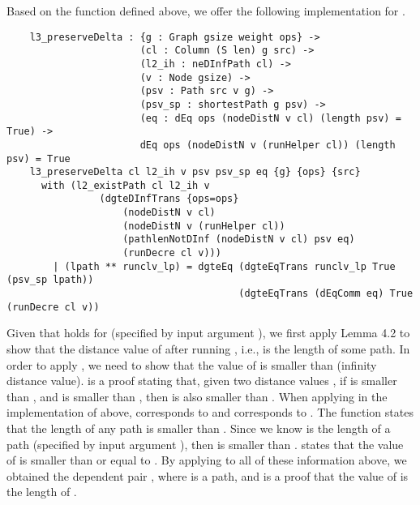 Based on the  function defined above, we offer the following implementation for . 
\begin{lstlisting}
	l3_preserveDelta : {g : Graph gsize weight ops} ->
	                   (cl : Column (S len) g src) ->
	                   (l2_ih : neDInfPath cl) ->
	                   (v : Node gsize) ->
	                   (psv : Path src v g) ->
	                   (psv_sp : shortestPath g psv) ->
	                   (eq : dEq ops (nodeDistN v cl) (length psv) = True) ->
	                   dEq ops (nodeDistN v (runHelper cl)) (length psv) = True
	l3_preserveDelta cl l2_ih v psv psv_sp eq {g} {ops} {src}
	  with (l2_existPath cl l2_ih v 
	  			(dgteDInfTrans {ops=ops} 
	  				(nodeDistN v cl) 
	  				(nodeDistN v (runHelper cl)) 
	  				(pathlenNotDInf (nodeDistN v cl) psv eq) 
	  				(runDecre cl v)))
	    | (lpath ** runclv_lp) = dgteEq (dgteEqTrans runclv_lp True (psv_sp lpath)) 
	    								(dgteEqTrans (dEqComm eq) True (runDecre cl v))
\end{lstlisting}

Given that  holds for  (specified by input argument ), we first apply Lemma 4.2  to show that the distance value of  after running , i.e.,  is the length of some  path. In order to apply , we need to show that the value of  is smaller than  (infinity distance value).  is a proof stating that, given two distance values , if  is smaller than , and  is smaller than , then  is also smaller than . When applying  in the implementation of  above,  corresponds to  and  corresponds to . The  function states that the length of any path is smaller than . Since we know  is the length of a path  (specified by input argument ), then  is smaller than .  states that the value of  is smaller than or equal to . By applying  to all of these information above, we obtained the dependent pair , where  is a  path, and  is a proof that the value of  is the length of . 
\\

